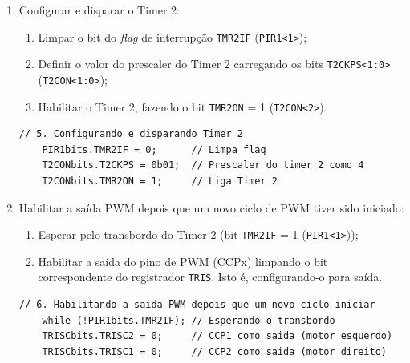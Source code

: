 \documentclass{article}
\begin{document}
\begin{enumerate}
  \item Configurar e disparar o Timer 2:
  \begin{enumerate}
    \item Limpar o bit do \textit{flag} de interrupção \texttt{TMR2IF} (\texttt{PIR1\textless1\textgreater});
    \item Definir o valor do prescaler do Timer 2 carregando os bits \texttt{T2CKPS\textless1:0\textgreater} (\texttt{T2CON\textless1:0\textgreater});
    \item Habilitar o Timer 2, fazendo o bit \texttt{TMR2ON} = 1 (\texttt{T2CON\textless2\textgreater}).
  \end{enumerate}
    \begin{lstlisting}[style = Matlab-editor, language = C2]
    // 5. Configurando e disparando Timer 2
    PIR1bits.TMR2IF = 0;      // Limpa flag
    T2CONbits.T2CKPS = 0b01;  // Prescaler do timer 2 como 4
    T2CONbits.TMR2ON = 1;     // Liga Timer 2
    \end{lstlisting}
    
  \item Habilitar a saída PWM depois que um novo ciclo de PWM tiver sido iniciado:
  \begin{enumerate}
    \item Esperar pelo transbordo do Timer 2 (bit \texttt{TMR2IF} = 1 (\texttt{PIR1\textless1\textgreater}));
    \item Habilitar a saída do pino de PWM (CCPx) limpando o bit correspondente do registrador \texttt{TRIS}. Isto é, configurando-o para saída.
  \end{enumerate}
    \begin{lstlisting}[style = Matlab-editor, language = C2]
    // 6. Habilitando a saida PWM depois que um novo ciclo iniciar
    while (!PIR1bits.TMR2IF); // Esperando o transbordo
    TRISCbits.TRISC2 = 0;     // CCP1 como saida (motor esquerdo)
    TRISCbits.TRISC1 = 0;     // CCP2 como saida (motor direito)
    \end{lstlisting}
      
\end{enumerate}
\end{document}
